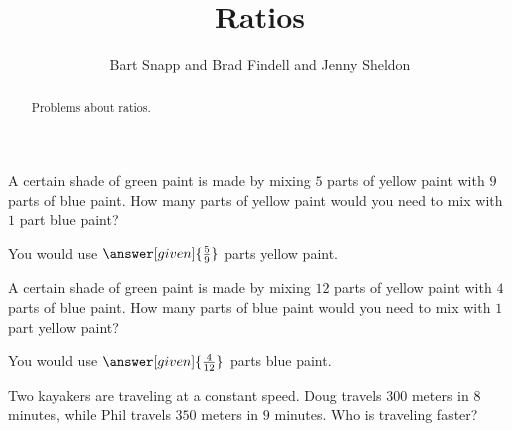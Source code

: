 \documentclass[nooutcomes]{ximera}
\title{Ratios}
\author{Bart Snapp and Brad Findell and Jenny Sheldon}
\begin{document}
\begin{abstract}
Problems about ratios.
\end{abstract}
\maketitle




\begin{problem}
A certain shade of green paint is made by mixing $5$ parts of yellow paint with $9$ parts of blue paint.  How many parts of yellow paint would you need to mix with $1$ part blue paint?

\begin{prompt}
You would use $\answer[given]{\frac{5}{9}}$ parts yellow paint.
\end{prompt}
\end{problem}


\begin{problem}
A certain shade of green paint is made by mixing $12$ parts of yellow paint with $4$ parts of blue paint.  How many parts of blue paint would you need to mix with $1$ part yellow paint?

\begin{prompt}
You would use $\answer[given]{\frac{4}{12}}$ parts blue paint.
\end{prompt}
\end{problem}



\begin{problem}
Two kayakers are traveling at a constant speed.  Doug travels $300$ meters in $8$ minutes, while Phil travels $350$ meters in $9$ minutes.  Who is traveling faster?

\begin{multipleChoice}
\end{multipleChoice}
\end{problem}
\end{document}
